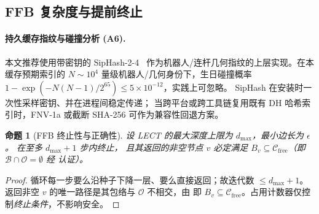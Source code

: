 \documentclass[journal]{IEEEtran}
\newtheorem{proposition}{命题}
\newcommand{\Cfree}{\mathcal{C}_{\mathrm{free}}}
\newcommand{\calO}{\mathcal{O}}
\begin{document}
\begin{table}[ht]
\centering
\caption{LECT 操作复杂度（$D$~维、$N$~节点、$L_\text{act}$~活动连杆、$K$~平均 mmap 命中砖数）}
\label{tab:lect_complexity}
\end{table}

\subsection{FFB 复杂度与提前终止}\label{sec:ffb_analysis}

\paragraph{持久缓存指纹与碰撞分析 (A6).}
本文推荐使用带密钥的 SipHash-2-4~\cite{aumasson2012siphash}
作为机器人/连杆几何指纹的上层实现。在本缓存预期索引的
$N\!\sim\!10^4$ 量级机器人/几何身份下，生日碰撞概率
$1-\exp(-N(N-1)/2^{65})\le 5\times 10^{-12}$，实践上可忽略。
SipHash 在安装时一次性采样密钥、并在进程间稳定传递；
当跨平台或跨工具链复用既有 DH 哈希索引时，FNV-1a 或截断 SHA-256
可作为兼容性回退方案。

\begin{proposition}[FFB 终止性与正确性]\label{prop:ffb}
设 LECT 的最大深度上限为 $d_{\max}$，最小边长为 $\epsilon$。
 在至多 $d_{\max}+1$ 步内终止，
且其返回的非空节点 $v$ 必定满足
$B_v\subseteq\Cfree$（即 $\mathcal{B}\cap\calO=\emptyset$
经  认证）。
\end{proposition}

\begin{proof}
循环每一步要么沿种子下降一层、要么直接返回；故迭代数
$\leq d_{\max}+1$。返回非空 $v$ 的唯一路径是其包络与
$\calO$ 不相交，由  即 $B_v\subseteq\Cfree$。占用计数器仅控制\emph{终止条件}，不影响安全。
\end{proof}
\end{document}
